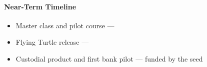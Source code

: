\paragraph{Near-Term Timeline}
\begin{itemize}
  \item Master class and pilot course --- \masterclassDate
  \item Flying Turtle release --- \flyingTurtleDate
  \item Custodial product and first bank pilot --- funded by the seed
\end{itemize}

